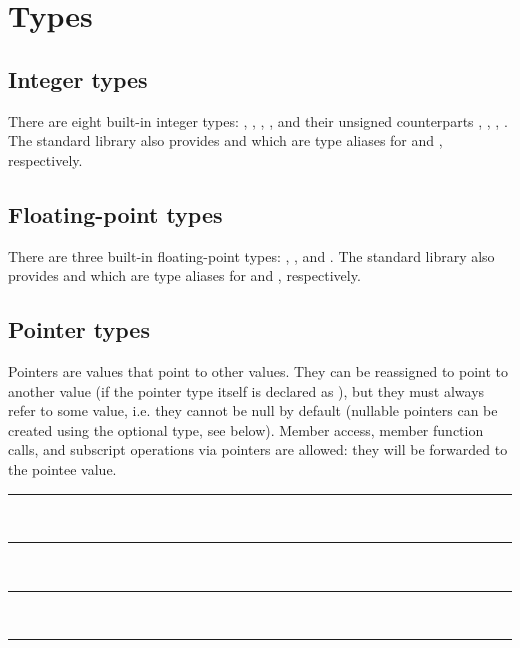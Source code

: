 
\chapter{Types}

\section{Integer types}

There are eight built-in integer types: , , ,
, and their unsigned counterparts , ,
, . The standard library also provides  and
 which are type aliases for  and ,
respectively.

\section{Floating-point types}

There are three built-in floating-point types: , ,
and . The standard library also provides  and
 which are type aliases for  and ,
respectively.

\section{Pointer types}

Pointers are values that point to other values. They can be reassigned to point
to another value (if the pointer type itself is declared as ), but
they must always refer to some value, i.e. they cannot be null by default
(nullable pointers can be created using the optional type, see below). Member
access, member function calls, and subscript operations via pointers are
allowed: they will be forwarded to the pointee value.

\begin{grammar}
\rule{pointer-type}  \code{*}\\
\rule{pointer-type}   \code{*}\\
\rule{pointer-type}   \code{*}\\
\rule{pointer-type}    \code{*}
\end{grammar}

